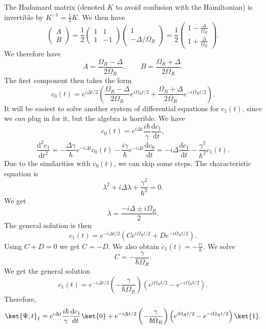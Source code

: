 \documentclass[11pt, letterpaper]{article}
\begin{document}
The Hadamard matrix (denoted $K$ to avoid confusion with the Hamiltonian) is invertible by $K^{-1} =\frac{1}{2} K$. We then have
\[
	\begin{pmatrix}
	A \\
	B
	\end{pmatrix}=\frac{1}{2} \begin{pmatrix}
	1 & 1 \\
	1 & -1
	\end{pmatrix}\begin{pmatrix}
	1 \\
	-\Delta /\Omega _R
	\end{pmatrix}=\frac{1}{2} \begin{pmatrix}
	1-\frac{\Delta }{\Omega _R}  \\
	1+\frac{\Delta }{\Omega _R} 
	\end{pmatrix}
.\]
We therefore have
\[
	A=\frac{\Omega _R-\Delta }{2\Omega _R} ,\qquad B=\frac{\Omega _R+\Delta }{2\Omega _R} 
.\]
The first component then takes the form
\[
	c_0(t)=e^{i\Delta t/2} \left( \frac{\Omega _R-\Delta }{2\Omega _R} e^{i\Omega _Rt/2} +\frac{\Omega _R+\Delta }{2\Omega _R} e^{-i\Omega _Rt/2}  \right) 
.\]
It will be easiest to solve another system of differential equations for $c_1(t)$, since we \emph{can} plug in for it, but the algebra is horrible. We have
\[
	c_0(t)=e^{i\Delta t} \frac{i\hbar}{\gamma } \frac{\mathrm{d}c_1}{\mathrm{d}t} 
,\]
\[
	\frac{\mathrm{d}^2c_1}{\mathrm{d}t^2} =-\frac{\Delta \gamma }{\hbar} e^{-i\Delta t} c_0(t)-\frac{i\gamma }{\hbar} e^{-i\Delta t} \frac{\mathrm{d}c_0}{\mathrm{d}t} =-i\Delta \frac{\mathrm{d}c_1}{\mathrm{d}t} -\frac{\gamma^2}{\hbar^2}c_1(t)
.\]
Due to the similarities with $c_0(t)$, we can skip some steps. The characteristic equation is
\[
	\lambda ^2+i\Delta \lambda+\frac{\gamma ^2}{\hbar^2} =0
.\]
We get
\[
	\lambda =\frac{-i\Delta \pm i\Omega _R}{2} 
.\]
The general solution is then
\[
	c_1(t)=e^{-i\Delta t/2} \left( Ce^{i\Omega _Rt/2} +De^{-i\Omega _Rt/2}  \right) 
.\]
Using $C+D=0$ we get $C=-D$. We also obtain $\dot{c}_1(t)=-\frac{i\gamma }{\hbar} $. We solve
\[
	C=-\frac{\gamma }{\hbar\Omega _R} 
.\]
We get the general solution
\[
	c_1(t)=e^{-i\Delta t/2} \left( -\frac{\gamma }{\hbar\Omega _R}  \right) \left( e^{i\Omega _Rt/2} -e^{-i\Omega _Rt/2}  \right) 
.\]
Therefore,
\[
	\ket{\Psi ,t}_I=e^{i\Delta t} \frac{i\hbar}{\gamma } \frac{\mathrm{d}c_1}{\mathrm{d}t}\ket{0}+e^{-i\Delta t/2} \left( -\frac{\gamma }{\hbar\Omega _R}  \right) \left( e^{i\Omega _Rt/2} -e^{-i\Omega _Rt/2}  \right) \ket{1}
.\]
\end{document}
